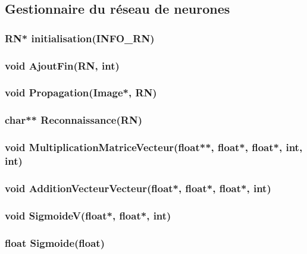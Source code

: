 \documentclass{article}
\begin{document}
	
	\subsection{Gestionnaire du réseau de neurones}
		\subsubsection{\textcolor{myblue}{\textbf{RN*}} initialisation(\textcolor{myblue}{\textbf{INFO\_RN}})}
		
		
		\subsubsection{\textcolor{myblue}{\textbf{void}} AjoutFin(\textcolor{myblue}{\textbf{RN}}, \textcolor{myblue}{\textbf{int}})}
		
		
		\subsubsection{\textcolor{myblue}{\textbf{void}} Propagation(\textcolor{myblue}{\textbf{Image*}}, \textcolor{myblue}{\textbf{RN}})}
		
		
		\subsubsection{\textcolor{myblue}{\textbf{char**}} Reconnaissance(\textcolor{myblue}{\textbf{RN}})}
		
		
		\subsubsection{\textcolor{myblue}{\textbf{void}} MultiplicationMatriceVecteur(\textcolor{myblue}{\textbf{float**}},  \textcolor{myblue}{\textbf{float*}},  \textcolor{myblue}{\textbf{float*}},  \textcolor{myblue}{\textbf{int}},  \textcolor{myblue}{\textbf{int}})}
		
		
		\subsubsection{\textcolor{myblue}{\textbf{void}} AdditionVecteurVecteur(\textcolor{myblue}{\textbf{float*}},  \textcolor{myblue}{\textbf{float*}},  \textcolor{myblue}{\textbf{float*}},  \textcolor{myblue}{\textbf{int}})}
		
		
		\subsubsection{\textcolor{myblue}{\textbf{void}} SigmoideV(\textcolor{myblue}{\textbf{float*}},  \textcolor{myblue}{\textbf{float*}},  \textcolor{myblue}{\textbf{int}})}
		
		
		\subsubsection{\textcolor{myblue}{\textbf{float}} Sigmoide(\textcolor{myblue}{\textbf{float}})}
		
		
		
\end{document}

